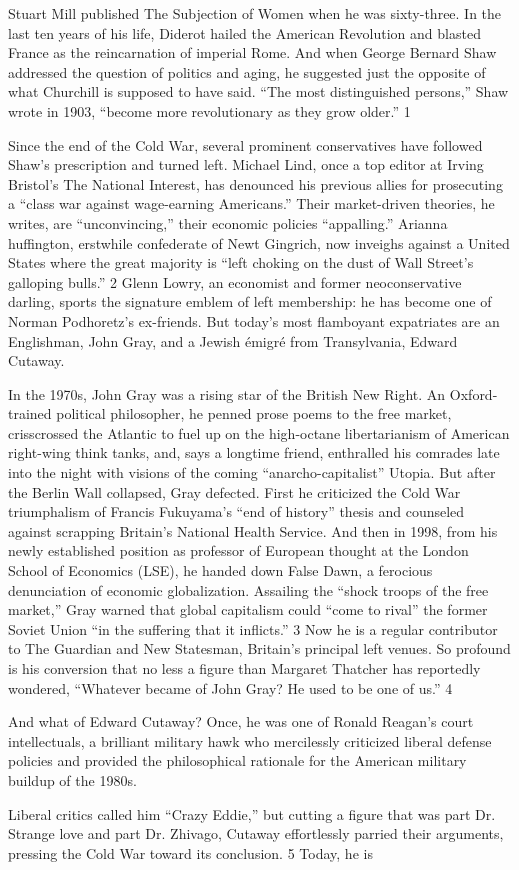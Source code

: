 Stuart Mill published The Subjection of Women when he was sixty-three. In the last ten years of his life, Diderot hailed the American Revolution and blasted France as the reincarnation of imperial Rome. And when George Bernard Shaw addressed the question of politics and aging, he suggested just the opposite of what Churchill is supposed to have said. “The most distinguished persons,” Shaw wrote in 1903, “become more revolutionary as they grow older.” {\color{blue} 1 } {\par} Since the end of the Cold War, several prominent conservatives have followed Shaw’s prescription and turned left. Michael Lind, once a top editor at Irving Bristol’s The National Interest, has denounced his previous allies for prosecuting a “class war against wage-earning Americans.” Their market-driven theories, he writes, are “unconvincing,” their economic policies “appalling.” Arianna huffington, erstwhile confederate of Newt Gingrich, now inveighs against a United States where the great majority is “left choking on the dust of Wall Street’s galloping bulls.” {\color{blue} 2 } Glenn Lowry, an economist and former neoconservative darling, sports the signature emblem of left membership: he has become one of Norman Podhoretz’s ex-friends. But today’s most flamboyant expatriates are an Englishman, John Gray, and a Jewish émigré from Transylvania, Edward Cutaway.{\par} In the 1970s, John Gray was a rising star of the British New Right. An Oxford-trained political philosopher, he penned prose poems to the free market, crisscrossed the Atlantic to fuel up on the high-octane libertarianism of American right-wing think tanks, and, says a longtime friend, enthralled his comrades late into the night with visions of the coming “anarcho-capitalist” Utopia. But after the Berlin Wall collapsed, Gray defected. First he criticized the Cold War triumphalism of Francis Fukuyama’s “end of history” thesis and counseled against scrapping Britain’s National Health Service. And then in 1998, from his newly established position as professor of European thought at the London School of Economics (LSE), he handed down False Dawn, a ferocious denunciation of economic globalization. Assailing the “shock troops of the free market,” Gray warned that global capitalism could “come to rival” the former Soviet Union “in the suffering that it inflicts.” {\color{blue} 3 } Now he is a regular contributor to The Guardian and New Statesman, Britain’s principal left venues. So profound is his conversion that no less a figure than Margaret Thatcher has reportedly wondered, “Whatever became of John Gray? He used to be one of us.” {\color{blue} 4 } {\par} And what of Edward Cutaway? Once, he was one of Ronald Reagan’s court intellectuals, a brilliant military hawk who mercilessly criticized liberal defense policies and provided the philosophical rationale for the American military buildup of the 1980s.{\par} Liberal critics called him “Crazy Eddie,” but cutting a figure that was part Dr. Strange love and part Dr. Zhivago, Cutaway effortlessly parried their arguments, pressing the Cold War toward its conclusion. {\color{blue} 5 } Today, he is 